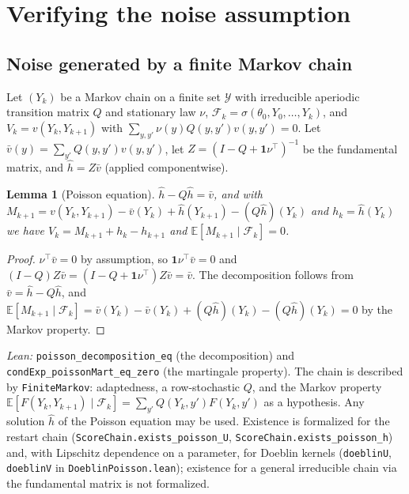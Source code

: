 \documentclass[11pt]{article}
\newtheorem{lemma}[theorem]{Lemma}
\theoremstyle{definition}
\theoremstyle{remark}
\newcommand{\E}{\mathbb{E}}
\newcommand{\F}{\mathcal{F}}
\newcommand{\Y}{\mathcal{Y}}
\begin{document}
\section{Verifying the noise assumption}\label{sec:verify}

\subsection{Noise generated by a finite Markov chain}

Let $(Y_k)$ be a Markov chain on a finite set $\Y$ with irreducible aperiodic transition
matrix $Q$ and stationary law $\nu$, $\F_k = \sigma(\theta_0, Y_0,\dots,Y_k)$, and
$V_k = v(Y_k, Y_{k+1})$ with $\sum_{y,y'}\nu(y)Q(y,y')v(y,y') = 0$. Let
$\bar v(y) = \sum_{y'}Q(y,y')v(y,y')$, let $Z = (I - Q + \mathbf 1\nu^\top)^{-1}$ be the
fundamental matrix, and $\hat h = Z\bar v$ (applied componentwise).

\begin{lemma}[Poisson equation]\label{lem:poisson}
$\hat h - Q\hat h = \bar v$, and with
$M_{k+1} = v(Y_k,Y_{k+1}) - \bar v(Y_k) + \hat h(Y_{k+1}) - (Q\hat h)(Y_k)$ and
$h_k = \hat h(Y_k)$ we have $V_k = M_{k+1} + h_k - h_{k+1}$ and $\E[M_{k+1}\mid\F_k] = 0$.
\end{lemma}
\begin{proof}
$\nu^\top\bar v = 0$ by assumption, so $\mathbf 1\nu^\top\bar v = 0$ and
$(I - Q)Z\bar v = (I - Q + \mathbf 1\nu^\top)Z\bar v = \bar v$. The decomposition follows
from $\bar v = \hat h - Q\hat h$, and $\E[M_{k+1}\mid\F_k] = \bar v(Y_k) - \bar v(Y_k) +
(Q\hat h)(Y_k) - (Q\hat h)(Y_k) = 0$ by the Markov property.
\end{proof}
\noindent\emph{Lean:} \texttt{poisson\_decomposition\_eq} (the decomposition) and
\texttt{condExp\_poissonMart\_eq\_zero} (the martingale property). The chain is described by
\texttt{FiniteMarkov}: adaptedness, a row-stochastic $Q$, and the Markov property
$\E[F(Y_k, Y_{k+1})\mid\F_k] = \sum_{y'}Q(Y_k, y')F(Y_k, y')$ as a hypothesis. Any solution $\hat h$
of the Poisson equation may be used. Existence is formalized for the restart chain
(\texttt{ScoreChain.exists\_poisson\_U}, \texttt{ScoreChain.exists\_poisson\_h}) and, with Lipschitz dependence on a
parameter, for Doeblin kernels (\texttt{doeblinU}, \texttt{doeblinV} in \texttt{DoeblinPoisson.lean}); existence for a
general irreducible chain via the fundamental matrix is not formalized.
\end{document}
